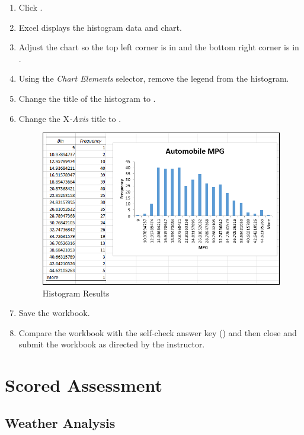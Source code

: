 \begin{enumbox}
\begin{enumerate}
		\item Click .
		\item Excel displays the histogram data and chart. 
		\item Adjust the chart so the top left corner is in  and the bottom right corner is in .
		\item Using the \textit{Chart Elements} selector, remove the legend from the histogram.
		\item Change the title of the histogram to .
		\item Change the X\textit{-Axis} title to .
	
		\begin{figure}[H]
			\centering
			\includegraphics[width=\maxwidth{.95\linewidth}]{gfx/ch09_fig77}
			\caption{Histogram Results}
			\label{09:fig77}
		\end{figure}
		\item Save the  workbook.
		\item Compare the workbook with the self-check answer key () and then close and submit the  workbook as directed by the instructor.
	
	\end{enumerate}
\end{enumbox}

\section{Scored Assessment}

\subsection{Weather Analysis}

